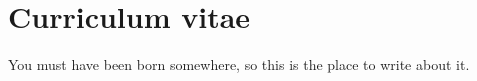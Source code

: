 \chapter*{Curriculum vitae}
You must have been born somewhere, so this is the place to write about it.